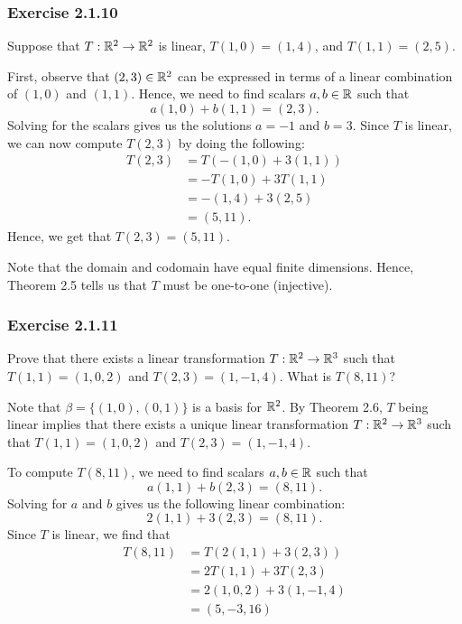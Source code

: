 \subsubsection{Exercise 2.1.10} Suppose that \( T: \mathbb{R}^{2} \to \mathbb{R}^{2} \) is linear, \( T(1,0) = (1,4) \), and \( T(1,1) = (2,5) \).
\begin{solution}
    First, observe that \( (2,3) \in \mathbb{R}^{2} \) can be expressed in terms of a linear combination of \( (1,0) \) and \( (1,1) \). Hence, we need to find scalars \( a,b \in \mathbb{R}  \) such that
    \[  a(1,0) + b(1,1) = (2,3). \]
    Solving for the scalars gives us the solutions \( a = - 1  \) and \( b = 3  \). Since \( T  \) is linear, we can now compute \( T(2,3)  \) by doing the following:
    \begin{align*}
        T(2,3) &= T(-(1,0) + 3(1,1)) \\
               &= -T(1,0) + 3 T(1,1) \\
               &= - (1,4) + 3(2,5) \\
               &= (5,11).
    \end{align*} 
    Hence, we get that \( T(2,3) = (5,11) \). 

    Note that the domain and codomain have equal finite dimensions. Hence, Theorem 2.5 tells us that \( T  \) must be one-to-one (injective).
\end{solution} 

\subsubsection{Exercise 2.1.11} Prove that there exists a linear transformation \( T: \mathbb{R}^{2} \to \mathbb{R}^{3} \) such that \( T(1,1) = (1,0,2) \) and \( T(2,3) = (1,-1,4) \). What is \( T(8,11)  \)?
\begin{solution}
    Note that \( \beta = \{ (1,0), (0,1) \}  \) is a basis for \( \mathbb{R}^{2} \). By Theorem 2.6, \( T \) being linear implies that there exists a unique linear transformation \( T: \mathbb{R}^{2} \to  \mathbb{R}^{3} \) such that \( T(1,1) = (1,0,2)  \) and \( T(2,3) = (1,-1,4) \). 

    To compute \( T(8,11) \), we need to find scalars \( a,b \in \mathbb{R}  \) such that
    \[  a(1,1) + b(2,3) = (8,11). \]
    Solving for \( a  \) and \( b \) gives us the following linear combination:
    \[ 2(1,1) + 3(2,3) = (8,11). \]
    Since \( T  \) is linear, we find that
    \begin{align*}
       T(8,11) &= T( 2(1,1)  + 3(2,3) ) \\
               &= 2T(1,1) + 3T(2,3) \\
               &= 2(1,0,2) + 3(1,-1,4) \\
               &= (5,-3, 16)
    \end{align*}
\end{solution}


